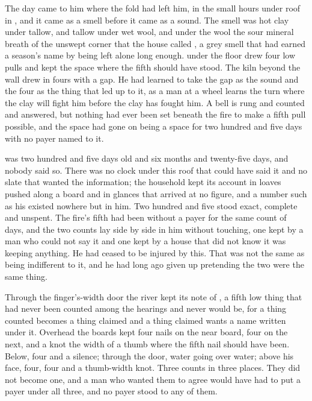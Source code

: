 
The day came to him where the fold had left him, in the small hours under  roof in , and it came as a smell before it came as a sound. The smell was hot clay under tallow, and tallow under wet wool, and under the wool the sour mineral breath of the unswept corner that the house called , a grey smell that had earned a season's name by being left alone long enough.  under the floor drew four low pulls and kept the space where the fifth should have stood. The kiln beyond the wall drew in fours with a gap. He had learned to take the gap as the sound and the four as the thing that led up to it, as a man at a wheel learns the turn where the clay will fight him before the clay has fought him. A bell is rung and counted and answered, but nothing had ever been set beneath the fire to make a fifth pull possible, and the space had gone on being a space for two hundred and five days with no payer named to it.

 was two hundred and five days old and six months and twenty-five days, and nobody said so. There was no clock under this roof that could have said it and no slate that wanted the information; the household kept its account in loaves pushed along a board and in glances that arrived at no figure, and a number such as his existed nowhere but in him. Two hundred and five stood exact, complete and unspent. The fire's fifth had been without a payer for the same count of days, and the two counts lay side by side in him without touching, one kept by a man who could not say it and one kept by a house that did not know it was keeping anything. He had ceased to be injured by this. That was not the same as being indifferent to it, and he had long ago given up pretending the two were the same thing.

Through the finger's-width door the river kept its note of , a fifth low thing that had never been counted among the hearings and never would be, for a thing counted becomes a thing claimed and a thing claimed wants a name written under it. Overhead the boards kept four nails on the near board, four on the next, and a knot the width of a thumb where the fifth nail should have been. Below, four and a silence; through the door, water going over water; above his face, four, four and a thumb-width knot. Three counts in three places. They did not become one, and a man who wanted them to agree would have had to put a payer under all three, and no payer stood to any of them.

